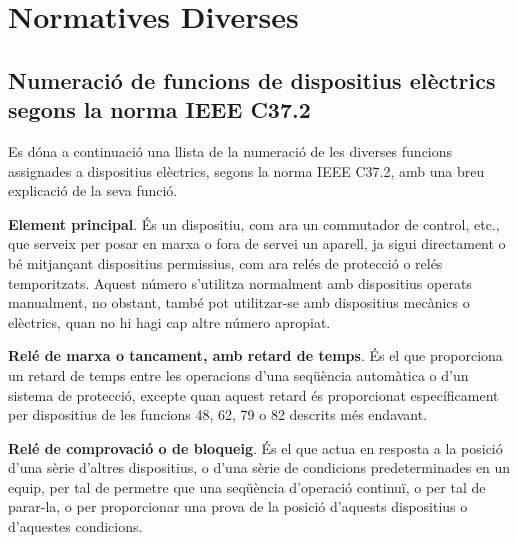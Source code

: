 \chapter{Normatives Diverses}

\section{Numeració de funcions de dispositius elèctrics segons la norma IEEE C37.2 }\label{sec:ieee-c37-2}

Es dóna a continuació una llista de la numeració de les diverses funcions assignades a dispositius
elèctrics, segons la norma IEEE C37.2, amb una breu
explicació de la seva funció.

\begin{multicols}{2}
\begin{list}{}
{\setlength{\labelwidth}{6mm} \setlength{\leftmargin}{6mm}
\setlength{\labelsep}{2mm}}

\item[\textbf{1}]  
\textbf{Element principal}. És un dispositiu, com ara un commutador de control, etc., que serveix per posar en marxa o fora de servei un aparell, ja sigui directament o bé  mitjançant
dispositius permissius, com ara relés de protecció o relés temporitzats. Aquest número s'utilitza normalment amb dispositius operats manualment, no obstant, també pot utilitzar-se amb dispositius mecànics o elèctrics, quan no hi hagi cap altre número apropiat.

\item[\textbf{2}]    
  
\textbf{Relé
de marxa o tancament, amb retard de temps}. És el que
proporciona un retard de temps entre les operacions d'una seqüència
automàtica o d'un sistema de protecció, excepte quan aquest retard
és proporcionat específicament per dispositius de les funcions 48, 62, 79 o 82
descrits més endavant.

\item[\textbf{3}]  
 \textbf{Relé de comprovació o
de bloqueig}. És el que actua en resposta a la posició d'una sèrie
d'altres dispositius, o d'una sèrie de condicions predeterminades
en un equip, per tal de permetre que una seqüència d'operació
continuï, o per tal de parar-la, o per proporcionar una prova de la
posició d'aquests dispositius o d'aquestes condicions.


\end{list}
\end{multicols}
